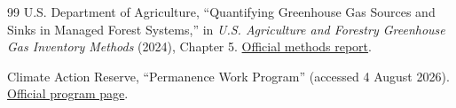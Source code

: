 \documentclass[10pt]{article}
\begin{document}
\begin{thebibliography}{99}
U.S. Department of Agriculture, ``Quantifying Greenhouse Gas Sources and Sinks
in Managed Forest Systems,'' in \emph{U.S. Agriculture and Forestry Greenhouse
Gas Inventory Methods} (2024), Chapter 5.
\href{https://www.usda.gov/sites/default/files/documents/USDA-Methods-Report-Chapter-5.pdf}{Official methods report}.

Climate Action Reserve, ``Permanence Work Program'' (accessed 4 August 2026).
\href{https://climateactionreserve.org/permanence-work-program/}{Official program page}.

\end{thebibliography}
\end{document}
